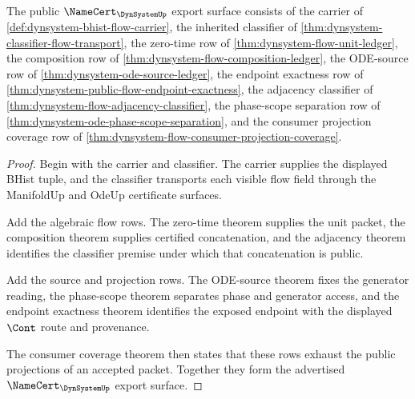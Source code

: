 \begin{theorem}
\label{thm:dynsystem-public-namecert-export}
The public $\NameCert_{\DynSystemUp}$ export surface consists of the carrier of \autoref{def:dynsystem-bhist-flow-carrier}, the inherited classifier of \autoref{thm:dynsystem-classifier-flow-transport}, the zero-time row of \autoref{thm:dynsystem-flow-unit-ledger}, the composition row of \autoref{thm:dynsystem-flow-composition-ledger}, the ODE-source row of \autoref{thm:dynsystem-ode-source-ledger}, the endpoint exactness row of \autoref{thm:dynsystem-public-flow-endpoint-exactness}, the adjacency classifier of \autoref{thm:dynsystem-flow-adjacency-classifier}, the phase-scope separation row of \autoref{thm:dynsystem-ode-phase-scope-separation}, and the consumer projection coverage row of \autoref{thm:dynsystem-flow-consumer-projection-coverage}.
\end{theorem}
\begin{proof}
Begin with the carrier and classifier. The carrier supplies the displayed BHist tuple, and the classifier transports each visible flow field through the ManifoldUp and OdeUp certificate surfaces.

Add the algebraic flow rows. The zero-time theorem supplies the unit packet, the composition theorem supplies certified concatenation, and the adjacency theorem identifies the classifier premise under which that concatenation is public.

Add the source and projection rows. The ODE-source theorem fixes the generator reading, the phase-scope theorem separates phase and generator access, and the endpoint exactness theorem identifies the exposed endpoint with the displayed $\Cont$ route and provenance.

The consumer coverage theorem then states that these rows exhaust the public projections of an accepted packet. Together they form the advertised $\NameCert_{\DynSystemUp}$ export surface.
\end{proof}

